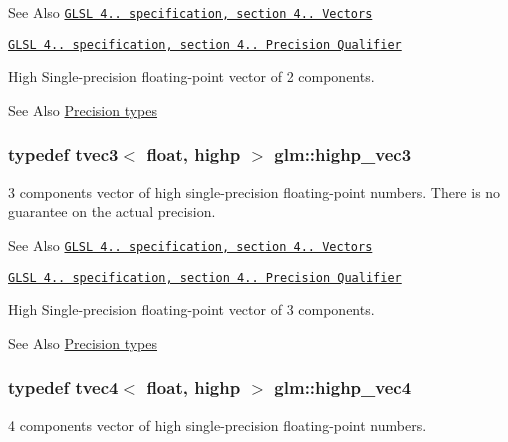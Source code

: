 \begin{DoxySeeAlso}{See Also}
\href{http://www.opengl.org/registry/doc/GLSLangSpec.4.20.8.pdf}{\tt G\-L\-S\-L 4.. specification, section 4.. Vectors} 

\href{http://www.opengl.org/registry/doc/GLSLangSpec.4.20.8.pdf}{\tt G\-L\-S\-L 4.. specification, section 4.. Precision Qualifier}
\end{DoxySeeAlso}
High Single-\/precision floating-\/point vector of 2 components. \begin{DoxySeeAlso}{See Also}
\hyperlink{group__core__precision}{Precision types} 
\end{DoxySeeAlso}
\hypertarget{group__core__precision_ga1ef07d2502ea09b1e63998813a3d4330}{
\subsubsection[{highp\-\_\-vec3}]{\setlength{\rightskip}{0pt plus 5cm}typedef tvec3$<$ float, highp $>$ {\bf glm\-::highp\-\_\-vec3}}}\label{group__core__precision_ga1ef07d2502ea09b1e63998813a3d4330}
3 components vector of high single-\/precision floating-\/point numbers. There is no guarantee on the actual precision.

\begin{DoxySeeAlso}{See Also}
\href{http://www.opengl.org/registry/doc/GLSLangSpec.4.20.8.pdf}{\tt G\-L\-S\-L 4.. specification, section 4.. Vectors} 

\href{http://www.opengl.org/registry/doc/GLSLangSpec.4.20.8.pdf}{\tt G\-L\-S\-L 4.. specification, section 4.. Precision Qualifier}
\end{DoxySeeAlso}
High Single-\/precision floating-\/point vector of 3 components. \begin{DoxySeeAlso}{See Also}
\hyperlink{group__core__precision}{Precision types} 
\end{DoxySeeAlso}
\hypertarget{group__core__precision_ga5f573b0132805b54cb9205eea1c86483}{
\subsubsection[{highp\-\_\-vec4}]{\setlength{\rightskip}{0pt plus 5cm}typedef tvec4$<$ float, highp $>$ {\bf glm\-::highp\-\_\-vec4}}}\label{group__core__precision_ga5f573b0132805b54cb9205eea1c86483}
4 components vector of high single-\/precision floating-\/point numbers.

